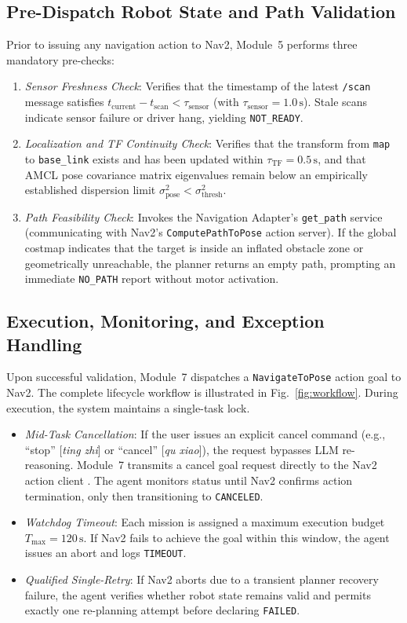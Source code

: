 \documentclass[conference]{IEEEtran}
\begin{document}
\subsection{Pre-Dispatch Robot State and Path Validation}
Prior to issuing any navigation action to Nav2, Module~5 performs three mandatory pre-checks:
\begin{enumerate}
    \item \textit{Sensor Freshness Check}: Verifies that the timestamp of the latest \texttt{/scan} message satisfies $t_{\text{current}} - t_{\text{scan}} < \tau_{\text{sensor}}$ (with $\tau_{\text{sensor}} = 1.0\,\text{s}$). Stale scans indicate sensor failure or driver hang, yielding \texttt{NOT\_READY}.
    \item \textit{Localization and TF Continuity Check}: Verifies that the transform from \texttt{map} to \texttt{base\_link} exists and has been updated within $\tau_{\text{TF}} = 0.5\,\text{s}$, and that AMCL pose covariance matrix eigenvalues remain below an empirically established dispersion limit $\sigma^2_{\text{pose}} < \sigma^2_{\text{thresh}}$.
    \item \textit{Path Feasibility Check}: Invokes the Navigation Adapter's \texttt{get\_path} service (communicating with Nav2's \texttt{ComputePathToPose} action server). If the global costmap indicates that the target is inside an inflated obstacle zone or geometrically unreachable, the planner returns an empty path, prompting an immediate \texttt{NO\_PATH} report without motor activation.
\end{enumerate}

\subsection{Execution, Monitoring, and Exception Handling}
Upon successful validation, Module~7 dispatches a \texttt{NavigateToPose} action goal to Nav2. The complete lifecycle workflow is illustrated in Fig.~\ref{fig:workflow}. During execution, the system maintains a single-task lock.
\begin{itemize}
    \item \textit{Mid-Task Cancellation}: If the user issues an explicit cancel command (e.g., ``stop'' [\textit{ting zhi}] or ``cancel'' [\textit{qu xiao}]), the request bypasses LLM re-reasoning. Module~7 transmits a cancel goal request directly to the Nav2 action client \cite{Nav2SimpleCommander}. The agent monitors status until Nav2 confirms action termination, only then transitioning to \texttt{CANCELED}.
    \item \textit{Watchdog Timeout}: Each mission is assigned a maximum execution budget $T_{\text{max}} = 120\,\text{s}$. If Nav2 fails to achieve the goal within this window, the agent issues an abort and logs \texttt{TIMEOUT}.
    \item \textit{Qualified Single-Retry}: If Nav2 aborts due to a transient planner recovery failure, the agent verifies whether robot state remains valid and permits exactly one re-planning attempt before declaring \texttt{FAILED}.
\end{itemize}
\end{document}
